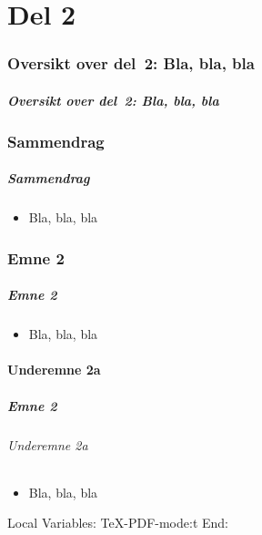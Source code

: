 \part{Del 2}

\begin{frame}
  \partpage
\end{frame}

\section*{Oversikt over del~2: Bla, bla, bla}
\begin{frame}%
  \frametitle{Oversikt over del~2: Bla, bla, bla}
    \tableofcontents%
\end{frame}

\section{Sammendrag}
\begin{frame}%
  \frametitle{Sammendrag}
  \pause
  \begin{itemize}[<+->]
  \item Bla, bla, bla
  \end{itemize}
\end{frame}

\section{Emne 2}
\begin{frame}%
  \frametitle{Emne 2}
  \pause
  \begin{itemize}[<+->]
  \item Bla, bla, bla
  \end{itemize}
\end{frame}

\subsection{Underemne 2a}
\begin{frame}%
  \frametitle{Emne 2}
  \framesubtitle{Underemne 2a}
  \pause
  \begin{itemize}[<+->]
  \item Bla, bla, bla
  \end{itemize}
\end{frame}



Local Variables:
TeX-PDF-mode:t
End:
